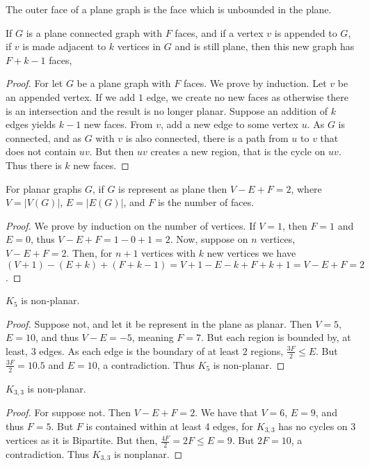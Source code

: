     \begin{definition}
    The outer face of a plane graph is the face which is unbounded in the plane.
    \end{definition}
    \begin{theorem}
    If $G$ is a plane connected graph with $F$ faces, and if a vertex $v$ is appended to $G$, if $v$ is made adjacent to $k$ vertices in $G$ and is still plane, then this new graph has $F+k-1$ faces,
    \end{theorem}
    \begin{proof}
    For let $G$ be a plane graph with $F$ faces. We prove by induction. Let $v$ be an appended vertex. If we add $1$ edge, we create no new faces as otherwise there is an intersection and the result is no longer planar. Suppose an addition of $k$ edges yields $k-1$ new faces. From $v$, add a new edge to some vertex $u$. As $G$ is connected, and as $G$ with $v$ is also connected, there is a path from $u$ to $v$ that does not contain $uv$. But then $uv$ creates a new region, that is the cycle on $uv$. Thus there is $k$ new faces.
    \end{proof}
    \begin{theorem}
    For planar graphs $G$, if $G$ is represent as plane then $V-E+F=2$, where $V = |V(G)|$, $E=|E(G)|$, and $F$ is the number of faces.
    \end{theorem}
    \begin{proof}
    We prove by induction on the number of vertices. If $V=1$, then $F=1$ and $E=0$, thus $V-E+F=1-0+1=2$. Now, suppose on $n$ vertices, $V-E+F=2$. Then, for $n+1$ vertices with $k$ new vertices we have $(V+1)-(E+k)+(F+k-1) = V+1-E-k+F+k+1 = V-E+F=2$.
    \end{proof}
    \begin{theorem}
    $K_5$ is non-planar.
    \end{theorem}
    \begin{proof}
    Suppose not, and let it be represent in the plane as planar. Then $V=5$, $E = 10$, and thus $V-E = -5$, meaning $F = 7$. But each region is bounded by, at least, $3$ edges. As each edge is the boundary of at least $2$ regions, $\frac{3F}{2} \leq E$. But $\frac{3F}{2} = 10.5$ and $E=10$, a contradiction. Thus $K_5$ is non-planar.
    \end{proof}
    \begin{theorem}
    $K_{3,3}$ is non-planar.
    \end{theorem}
    \begin{proof}
    For suppose not. Then $V-E+F=2$. We have that $V=6$, $E= 9$, and thus $F=5$. But $F$ is contained within at least 4 edges, for $K_{3,3}$ has no cycles on $3$ vertices as it is Bipartite. But then, $\frac{4F}{2} = 2F \leq E = 9$. But $2F = 10$, a contradiction. Thus $K_{3,3}$ is nonplanar.
    \end{proof}
